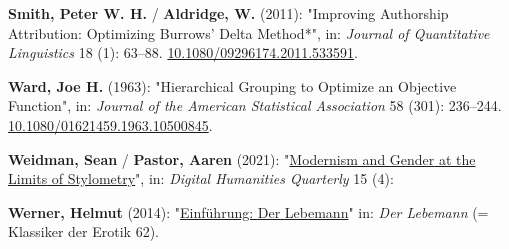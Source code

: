 \documentclass[
  12pt,
  letterpaper,
  DIV=11,
  numbers=noendperiod]{scrreprt}
\newlength{\cslhangindent}
\newenvironment{CSLReferences}[2] %
 {\begin{list}{}{%
  \setlength{\itemindent}{0pt}
  \setlength{\leftmargin}{0pt}
  \setlength{\parsep}{0pt}
  \ifodd #1
   \setlength{\leftmargin}{\cslhangindent}
   \setlength{\itemindent}{-1\cslhangindent}
  \fi
  \setlength{\itemsep}{#2\baselineskip}}}
 {\end{list}}
\begin{document}
\begin{CSLReferences}{1}{0}
\textbf{Smith, Peter W. H.} / \textbf{Aldridge, W.} (2011): "Improving
{Authorship} {Attribution}: {Optimizing} {Burrows}' {Delta} {Method}*",
in: \emph{Journal of Quantitative Linguistics} 18 (1): 63--88.
\href{https://doi.org/10.1080/09296174.2011.533591}{10.1080/09296174.2011.533591}.

\textbf{Ward, Joe H.} (1963): "Hierarchical {Grouping} to {Optimize} an
{Objective} {Function}", in: \emph{Journal of the American Statistical
Association} 58 (301): 236--244.
\href{https://doi.org/10.1080/01621459.1963.10500845}{10.1080/01621459.1963.10500845}.

\textbf{Weidman, Sean} / \textbf{Pastor, Aaren} (2021):
"\href{https://www.digitalhumanities.org/dhq/vol/15/4/000566/000566.html}{Modernism
and {Gender} at the {Limits} of {Stylometry}}", in: \emph{Digital
Humanities Quarterly} 15 (4):

\textbf{Werner, Helmut} (2014):
"\href{https://seyerlein.de/shop/item/9783944964744/klassiker-der-erotik-62-der-lebemann-von-andrea-de-nerciat-e-book-epub}{Einführung:
{Der} {Lebemann}}" in: \emph{Der {Lebemann}} (= Klassiker der {Erotik}
62).

\end{CSLReferences}



\printindex
\end{document}
